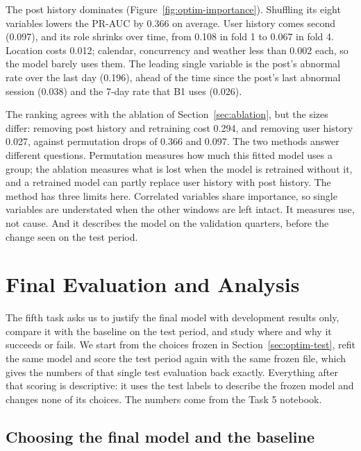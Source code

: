 \documentclass[12pt,a4paper,openany]{report}
\begin{document}
The post history dominates (Figure~\ref{fig:optim-importance}). Shuffling its eight variables lowers the
\acs{PR-AUC} by 0.366 on average. User history comes second (0.097), and
its role shrinks over time, from 0.108 in fold 1 to 0.067 in fold 4. Location costs 0.012; calendar, concurrency
and weather less than 0.002 each, so the model barely uses them. The leading single variable is the post's abnormal
rate over the last day (0.196), ahead of the time since the post's last abnormal session (0.038) and the 7-day rate
that B1 uses (0.026).

The ranking agrees with the ablation of Section~\ref{sec:ablation}, but the sizes differ: removing post history and
retraining cost 0.294, and removing user history 0.027, against permutation drops of 0.366 and 0.097. The two
methods answer different questions. Permutation measures how much this fitted model uses a group; the ablation
measures what is lost when the model is retrained without it, and a retrained model can partly replace user
history with post history. The method has three limits here. Correlated variables share importance, so single
variables are understated when the other windows are left intact. It measures use, not cause. And it describes
the model on the validation quarters, before the change seen on the test period.

\chapter{Final Evaluation and Analysis}\label{ch:t5}

The fifth task asks us to justify the final model with development results only, compare it with the baseline on
the test period, and study where and why it succeeds or fails. We start from the choices frozen in
Section~\ref{sec:optim-test}, refit the same model and score the test period again with the same frozen file, which
gives the numbers of that single test evaluation back exactly. Everything after that scoring is descriptive: it uses the test labels to
describe the frozen model and changes none of its choices. The numbers come from the Task 5 notebook.

\section{Choosing the final model and the baseline}\label{sec:t5-selection}
\end{document}

